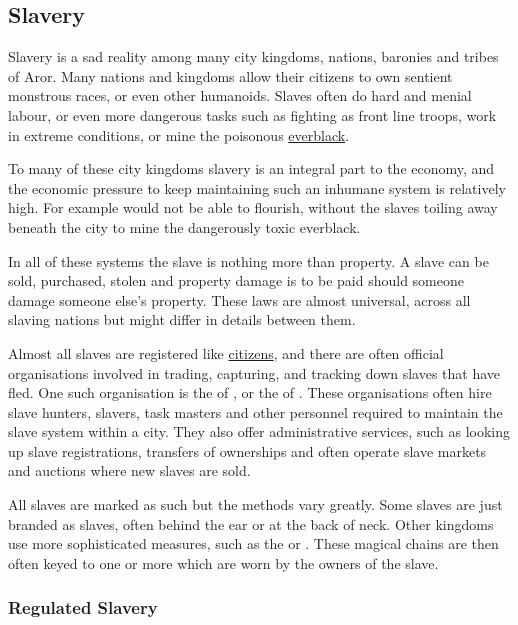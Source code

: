 \subsection{Slavery}
\label{sec:Slavery}

Slavery is a sad reality among many city kingdoms, nations, baronies and
tribes of Aror. Many nations and kingdoms allow their citizens to own
sentient monstrous races, or even other humanoids. Slaves often do
hard and menial labour, or even more dangerous tasks such as fighting
as front line troops, work in extreme conditions, or mine the poisonous
\hyperref[sec:Everblack]{everblack}.

To many of these city kingdoms slavery is an integral part to the economy,
and the economic pressure to keep maintaining such an inhumane system
is relatively high. For example  would not be able
to flourish, without the slaves toiling away beneath the city to mine
the dangerously toxic everblack.

In all of these systems the slave is nothing more than property. A slave
can be sold, purchased, stolen and property damage is to be paid should
someone damage someone else's property. These laws are almost universal,
across all slaving nations but might differ in details between them.

Almost all slaves are registered like \hyperref[sec:Citizenship]{citizens},
and there are often official organisations involved in trading, capturing,
and tracking down slaves that have fled. One such organisation is the
 of , or the
 of . These organisations
often hire slave hunters, slavers, task masters and other personnel required
to maintain the slave system within a city. They also offer administrative
services, such as looking up slave registrations, transfers of ownerships and
often operate slave markets and auctions where new slaves are sold.

All slaves are marked as such but the methods vary greatly. Some slaves
are just branded as slaves, often behind the ear or at the back of neck.
Other kingdoms use more sophisticated measures, such as the
 or . These magical
chains are then often keyed to one or more  which
are worn by the owners of the slave.

\subsubsection{Regulated Slavery}
\label{sec:Regulated Slavery}

